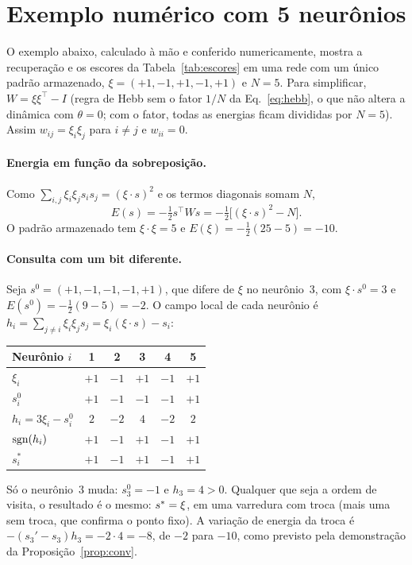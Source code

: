 \section{Exemplo numérico com 5 neurônios}\label{apx:exemplo}

O exemplo abaixo, calculado à mão e conferido numericamente, mostra a recuperação e os escores da
Tabela~\ref{tab:escores} em uma rede com um único padrão armazenado, $\xi=(+1,-1,+1,-1,+1)$ e $N=5$. Para
simplificar, $W=\xi\xi^{\top}-I$ (regra de Hebb sem o fator $1/N$ da Eq.~\eqref{eq:hebb}, o que não altera a
dinâmica com $\theta=0$; com o fator, todas as energias ficam divididas por $N=5$). Assim
$w_{ij}=\xi_i\xi_j$ para $i\neq j$ e $w_{ii}=0$.

\paragraph{Energia em função da sobreposição.} Como $\sum_{i,j}\xi_i\xi_js_is_j=(\xi\cdot s)^2$ e os termos
diagonais somam $N$,
\[
E(s)=-\tfrac12 s^{\top}Ws=-\tfrac12\bigl[(\xi\cdot s)^2-N\bigr].
\]
O padrão armazenado tem $\xi\cdot\xi=5$ e $E(\xi)=-\tfrac12(25-5)=-10$.

\paragraph{Consulta com um bit diferente.} Seja $s^0=(+1,-1,-1,-1,+1)$, que difere de $\xi$ no neurônio~3, com
$\xi\cdot s^0=3$ e $E(s^0)=-\tfrac12(9-5)=-2$. O campo local de cada neurônio é
$h_i=\sum_{j\neq i}\xi_i\xi_js_j=\xi_i(\xi\cdot s)-s_i$:
\begin{center}
\small
\begin{tabular}{@{}lccccc@{}}
\toprule
Neurônio $i$ & 1 & 2 & 3 & 4 & 5\\
\midrule
$\xi_i$ & $+1$ & $-1$ & $+1$ & $-1$ & $+1$\\
$s^0_i$ & $+1$ & $-1$ & $-1$ & $-1$ & $+1$\\
$h_i=3\xi_i-s^0_i$ & $2$ & $-2$ & $4$ & $-2$ & $2$\\
$\operatorname{sgn}(h_i)$ & $+1$ & $-1$ & $+1$ & $-1$ & $+1$\\
$s^{\ast}_i$ & $+1$ & $-1$ & $+1$ & $-1$ & $+1$\\
\bottomrule
\end{tabular}
\end{center}
Só o neurônio~3 muda: $s^0_3=-1$ e $h_3=4>0$. Qualquer que seja a ordem de visita, o resultado é o mesmo:
$s^{\ast}=\xi$, em uma varredura com troca (mais uma sem troca, que confirma o ponto fixo). A variação de energia
da troca é $-(s_3'-s_3)h_3=-2\cdot4=-8$, de $-2$ para $-10$, como previsto pela demonstração da
Proposição~\ref{prop:conv}.

